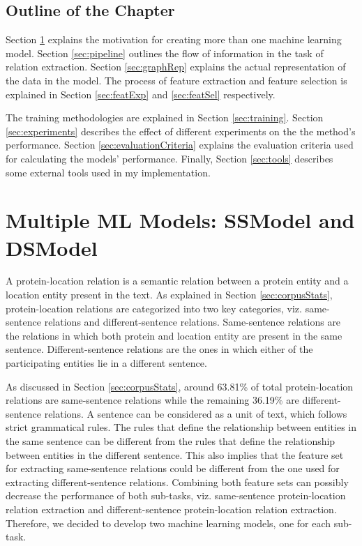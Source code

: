 \subsection*{Outline of the Chapter}

Section \ref{sec:ssModeldsModel} explains the motivation for creating more than one machine learning model. Section \ref{sec:pipeline} outlines the flow of information in the task of relation extraction. Section \ref{sec:graphRep} explains the actual representation of the data in the model. The process of feature extraction and feature selection is explained in Section \ref{sec:featExp} and \ref{sec:featSel} respectively.

The training methodologies are explained in Section \ref{sec:training}. Section \ref{sec:experiments} describes the effect of different experiments on the the method's performance. Section \ref{sec:evaluationCriteria} explains the evaluation criteria used for calculating the models' performance. Finally, Section \ref{sec:tools} describes some external tools used in my implementation.

\section{Multiple ML Models: SSModel and DSModel}\label{sec:ssModeldsModel}

A protein-location relation is a semantic relation between a protein entity and a location entity present in the text. As explained in Section \ref{sec:corpusStats}, protein-location relations are categorized into two key categories, viz. same-sentence relations and different-sentence relations. Same-sentence relations are the relations in which both protein and location entity are present in the same sentence. Different-sentence relations are the ones in which either of the participating entities lie in a different sentence.

As discussed in Section \ref{sec:corpusStats}, around 63.81\% of total protein-location relations are same-sentence relations while the remaining 36.19\% are different-sentence relations. A sentence can be considered as a unit of text, which follows strict grammatical rules. The rules that define the relationship between entities in the same sentence can be different from the rules that define the relationship between entities in the different sentence. This also implies that the feature set for extracting same-sentence relations could be different from the one used for extracting different-sentence relations. Combining both feature sets can possibly decrease the performance of both sub-tasks, viz. same-sentence protein-location relation extraction and different-sentence protein-location relation extraction. Therefore, we decided to develop two machine learning models, one for each sub-task.


